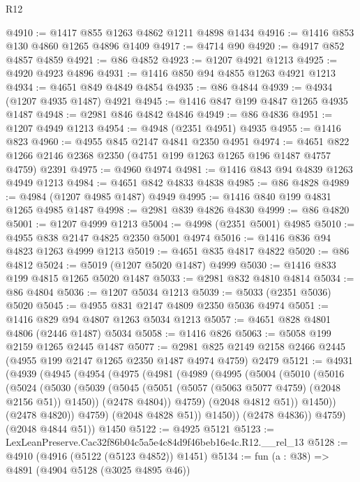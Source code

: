 \begin{lexlean}{R12}
\begin{coremodule}
@4910 := @1417 @855 @1263 @4862 @1211 @4898 @1434
@4916 := @1416 @853 @130 @4860 @1265 @4896 @1409
@4917 := @4714 @90
@4920 := @4917 @852 @4857 @4859
@4921 := @86 @4852
@4923 := @1207 @4921 @1213
@4925 := @4920 @4923 @4896
@4931 := @1416 @850 @94 @4855 @1263 @4921 @1213
@4934 := @4651 @849 @4849 @4854
@4935 := @86 @4844
@4939 := @4934 (@1207 @4935 @1487) @4921
@4945 := @1416 @847 @199 @4847 @1265 @4935 @1487
@4948 := @2981 @846 @4842 @4846
@4949 := @86 @4836
@4951 := @1207 @4949 @1213
@4954 := @4948 (@2351 @4951) @4935
@4955 := @1416 @823
@4960 := @4955 @845 @2147 @4841 @2350 @4951
@4974 := @4651 @822 @1266 @2146 @2368 @2350 (@4751 @199 @1263 @1265 @196 @1487 @4757 @4759) @2391
@4975 := @4960 @4974
@4981 := @1416 @843 @94 @4839 @1263 @4949 @1213
@4984 := @4651 @842 @4833 @4838
@4985 := @86 @4828
@4989 := @4984 (@1207 @4985 @1487) @4949
@4995 := @1416 @840 @199 @4831 @1265 @4985 @1487
@4998 := @2981 @839 @4826 @4830
@4999 := @86 @4820
@5001 := @1207 @4999 @1213
@5004 := @4998 (@2351 @5001) @4985
@5010 := @4955 @838 @2147 @4825 @2350 @5001 @4974
@5016 := @1416 @836 @94 @4823 @1263 @4999 @1213
@5019 := @4651 @835 @4817 @4822
@5020 := @86 @4812
@5024 := @5019 (@1207 @5020 @1487) @4999
@5030 := @1416 @833 @199 @4815 @1265 @5020 @1487
@5033 := @2981 @832 @4810 @4814
@5034 := @86 @4804
@5036 := @1207 @5034 @1213
@5039 := @5033 (@2351 @5036) @5020
@5045 := @4955 @831 @2147 @4809 @2350 @5036 @4974
@5051 := @1416 @829 @94 @4807 @1263 @5034 @1213
@5057 := @4651 @828 @4801 @4806 (@2446 @1487) @5034
@5058 := @1416 @826
@5063 := @5058 @199 @2159 @1265 @2445 @1487
@5077 := @2981 @825 @2149 @2158 @2466 @2445 (@4955 @199 @2147 @1265 @2350 @1487 @4974 @4759) @2479
@5121 := @4931
    (@4939
      (@4945
        (@4954
          (@4975
            (@4981
              (@4989
                (@4995
                  (@5004
                    (@5010
                      (@5016
                        (@5024
                          (@5030
                            (@5039
                              (@5045 (@5051 (@5057 (@5063 @5077 @4759) (@2048 @2156 @51)) @1450))
                              (@2478 @4804))
                            @4759)
                          (@2048 @4812 @51))
                        @1450))
                    (@2478 @4820))
                  @4759)
                (@2048 @4828 @51))
              @1450))
          (@2478 @4836))
        @4759)
      (@2048 @4844 @51))
    @1450
@5122 := @4925 @5121
@5123 := LexLeanPreserve.Cac32f86b04c5a5e4c84d9f46beb16e4c.R12.__rel_13
@5128 := @4910 (@4916 (@5122 (@5123 @4852)) @1451)
@5134 := fun (a : @38) => @4891 (@4904 @5128 (@3025 @4895 @46))

\end{coremodule}
\end{lexlean}
